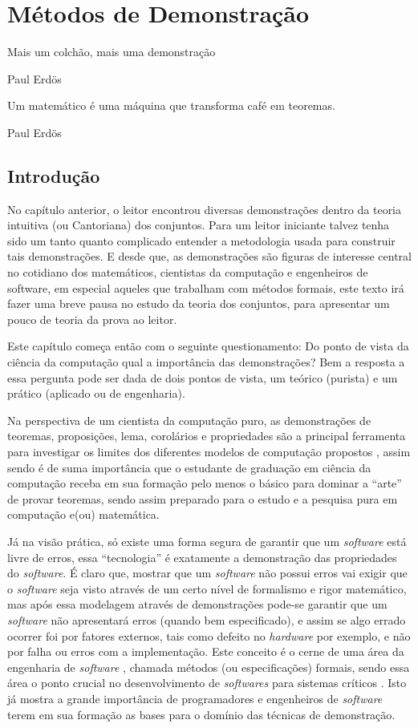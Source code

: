 \chapter{Métodos de Demonstração}\label{cap:Demonstracoes}

\epigraph{Mais um colchão, mais uma demonstração}{Paul Erdös}

\epigraph{Um matemático é uma máquina que transforma café em teoremas.}{Paul Erdös}

\section{Introdução}\label{sec:Introducao-Demonstracoes}

No capítulo anterior, o leitor encontrou diversas demonstrações dentro da teoria intuitiva (ou Cantoriana) dos conjuntos. Para um leitor iniciante talvez tenha sido um tanto quanto complicado entender a metodologia usada para construir tais demonstrações. E desde que, as demonstrações são figuras de interesse central no cotidiano dos matemáticos, cientistas da computação e engenheiros de software, em especial aqueles que trabalham com métodos formais, este texto irá fazer uma breve pausa no estudo da teoria dos conjuntos, para apresentar um pouco de teoria da prova ao leitor.

Este capítulo começa então com o seguinte questionamento: Do ponto de vista da ciência da computação qual a importância das demonstrações? Bem a resposta a essa pergunta pode ser dada de dois pontos de vista,  um teórico (purista) e um prático (aplicado ou de engenharia).

Na perspectiva de um cientista da computação puro, as demonstrações de teoremas, proposições, lema, corolários e propriedades são a principal ferramenta para investigar os limites dos diferentes modelos de computação propostos \cite{hopcroft2008, linz2006}, assim sendo é de suma importância que o estudante de graduação em ciência da computação receba em sua formação pelo menos o básico para dominar a ``arte'' de provar teoremas, sendo assim preparado para o estudo e a pesquisa pura em computação e(ou) matemática.

Já na visão prática, só existe uma forma segura de garantir que um \textit{software} está livre de erros, essa ``tecnologia'' é exatamente a demonstração das propriedades do \textit{software}. É claro que, mostrar que um \textit{software} não possui erros vai exigir que o \textit{software} seja visto através de um certo nível de formalismo e rigor matemático, mas após essa modelagem através de demonstrações pode-se garantir que um \textit{software} não apresentará erros (quando bem especificado), e assim se algo errado ocorrer foi por fatores externos, tais como defeito no \textit{hardware} por exemplo, e não por falha ou erros com a implementação. Este conceito é o cerne de uma área da engenharia de \textit{software} \cite{pressman2016}, chamada métodos  (ou especificações) formais, sendo essa área o ponto crucial no desenvolvimento de \textit{softwares} para sistemas críticos \cite{sommerville2011}. Isto já mostra a grande importância de programadores e engenheiros de \textit{software} terem em sua formação as bases para o domínio das técnicas de demonstração.

